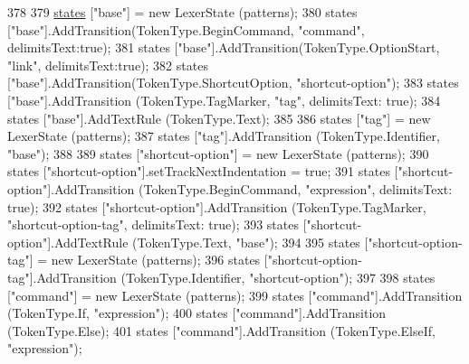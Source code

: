 \begin{DoxyCode}
{378 
379             \hyperlink{a00129_a2c65c0ba90f973e459583badefef216a}{states} [\textcolor{stringliteral}{"base"}] = \textcolor{keyword}{new} LexerState (patterns);
380             states [\textcolor{stringliteral}{"base"}].AddTransition(TokenType.BeginCommand, \textcolor{stringliteral}{"command"}, delimitsText:\textcolor{keyword}{true});
381             states [\textcolor{stringliteral}{"base"}].AddTransition(TokenType.OptionStart, \textcolor{stringliteral}{"link"}, delimitsText:\textcolor{keyword}{true});
382             states [\textcolor{stringliteral}{"base"}].AddTransition(TokenType.ShortcutOption, \textcolor{stringliteral}{"shortcut-option"});
383             states [\textcolor{stringliteral}{"base"}].AddTransition (TokenType.TagMarker, \textcolor{stringliteral}{"tag"}, delimitsText: \textcolor{keyword}{true});
384             states [\textcolor{stringliteral}{"base"}].AddTextRule (TokenType.Text);
385 
386             states [\textcolor{stringliteral}{"tag"}] = \textcolor{keyword}{new} LexerState (patterns);
387             states [\textcolor{stringliteral}{"tag"}].AddTransition (TokenType.Identifier, \textcolor{stringliteral}{"base"});
388 
389             states [\textcolor{stringliteral}{"shortcut-option"}] = \textcolor{keyword}{new} LexerState (patterns);
390             states [\textcolor{stringliteral}{"shortcut-option"}].setTrackNextIndentation = \textcolor{keyword}{true};
391             states [\textcolor{stringliteral}{"shortcut-option"}].AddTransition (TokenType.BeginCommand, \textcolor{stringliteral}{"expression"}, delimitsText: \textcolor{keyword}{
      true});
392             states [\textcolor{stringliteral}{"shortcut-option"}].AddTransition (TokenType.TagMarker, \textcolor{stringliteral}{"shortcut-option-tag"}, 
      delimitsText: \textcolor{keyword}{true});
393             states [\textcolor{stringliteral}{"shortcut-option"}].AddTextRule (TokenType.Text, \textcolor{stringliteral}{"base"});
394 
395             states [\textcolor{stringliteral}{"shortcut-option-tag"}] = \textcolor{keyword}{new} LexerState (patterns);
396             states [\textcolor{stringliteral}{"shortcut-option-tag"}].AddTransition (TokenType.Identifier, \textcolor{stringliteral}{"shortcut-option"});
397 
398             states [\textcolor{stringliteral}{"command"}] = \textcolor{keyword}{new} LexerState (patterns);
399             states [\textcolor{stringliteral}{"command"}].AddTransition (TokenType.If, \textcolor{stringliteral}{"expression"});
400             states [\textcolor{stringliteral}{"command"}].AddTransition (TokenType.Else);
401             states [\textcolor{stringliteral}{"command"}].AddTransition (TokenType.ElseIf, \textcolor{stringliteral}{"expression"});
}
\end{DoxyCode}
